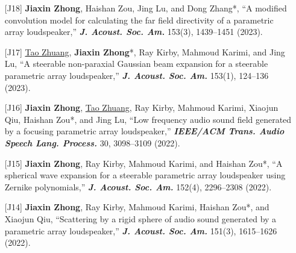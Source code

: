 \documentclass[10pt,a4paper,ragged2e,withhyper]{altacv}
\newcommand{\PubJournal}[1]{\textbf{\textit{#1}}}
\newcommand{\PubTitle}[1]{``{#1,}''}
\newcommand{\PubCorAuthor}[1]{#1*}
\newcommand{\PubMe}[1]{\textbf{#1}}
\begin{document}
\begin{itemize}[leftmargin = 30pt]
    \item[{[J18]}]
    \PubMe{Jiaxin Zhong}, Haishan Zou, Jing Lu, and \PubCorAuthor{Dong Zhang},
    \PubTitle{A modified convolution model for calculating the far field directivity of a parametric array loudspeaker}
    \PubJournal{J. Acoust. Soc. Am.}
    153(3), 1439--1451 (2023).
    \href{https://doi.org/10.1121/10.0017361}{\color{accent}\aiDoi}
    \href{https://github.com/JiaxinZhong/JiaxinZhong.github.io/raw/master/publications/journal/Zhong2023-JASA-PAL_CDM.pdf}{\color{accent}\faFilePdf[regular]}


    \item[{[J17]}]
    \underline{Tao Zhuang},
    \PubCorAuthor{\PubMe{Jiaxin Zhong}},
    Ray Kirby, Mahmoud Karimi, and Jing Lu,
    \PubTitle{A steerable non-paraxial Gaussian beam expansion for a steerable parametric array loudspeaker}
    \PubJournal{J. Acoust. Soc. Am.}
    153(1), 124--136 (2023).
    \href{https://doi.org/10.1121/10.0016816}{\color{accent}\aiDoi}
    \href{https://github.com/JiaxinZhong/JiaxinZhong.github.io/raw/master/publications/journal/Zhuang2023-JASA-PAL_steerable_GBE.pdf}{\color{accent}\faFilePdf[regular]}

    \item[{[J16]}]
    \PubMe{Jiaxin Zhong}, \underline{Tao Zhuang}, Ray Kirby, Mahmoud Karimi, Xiaojun Qiu, \PubCorAuthor{Haishan Zou}, and Jing Lu,
    \PubTitle{Low frequency audio sound field generated by a focusing parametric array loudspeaker}
    \PubJournal{IEEE/ACM Trans. Audio Speech Lang. Process.}
    30, 3098--3109 (2022).
    \href{https://doi.org/10.1109/TASLP.2022.3209944}{\color{accent}\aiDoi}
    \href{https://github.com/JiaxinZhong/JiaxinZhong.github.io/raw/master/publications/journal/Zhong2022-IEEETASLP-Focusing_PAL.pdf}{\color{accent}\faFilePdf[regular]}

    \item[{[J15]}]
    \PubMe{Jiaxin Zhong}, Ray Kirby, Mahmoud Karimi, and \PubCorAuthor{Haishan Zou},
    \PubTitle{A spherical wave expansion for a steerable parametric array loudspeaker using Zernike polynomials}
    \PubJournal{J. Acoust. Soc. Am.}
    152(4), 2296--2308 (2022).
    \href{https://doi.org/10.1121/10.0014832}{\color{accent}\aiDoi}
    \href{https://github.com/JiaxinZhong/JiaxinZhong.github.io/raw/master/publications/journal/Zhong2022-JASA-PAL_Zernike.pdf}{\color{accent}\faFilePdf[regular]}

    \item[{[J14]}]
    \PubMe{Jiaxin Zhong}, Ray Kirby, Mahmoud Karimi, \PubCorAuthor{Haishan Zou}, and Xiaojun Qiu,
    \PubTitle{Scattering by a rigid sphere of audio sound generated by a parametric array loudspeaker}
    \PubJournal{J. Acoust. Soc. Am.}
    151(3), 1615--1626 (2022).
    \href{https://doi.org/10.1121/10.0009750}{\color{accent}\aiDoi}
    \href{https://github.com/JiaxinZhong/JiaxinZhong.github.io/raw/master/publications/journal/Zhong2022-JASA-PAL_sphere.pdf}{\color{accent}\faFilePdf[regular]}


\end{itemize}
\end{document}
